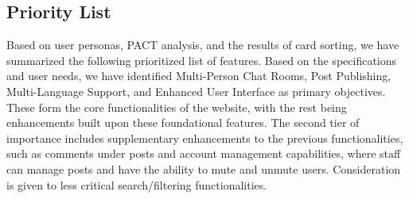 \documentclass[12pt]{article}
\begin{document}
\subsection{Priority List}

    \hspace{2em}Based on user personas, PACT analysis, and the results of card sorting, we have summarized the following prioritized list of features. Based on the specifications and user needs, we have identified Multi-Person Chat Rooms, Post Publishing, Multi-Language Support, and Enhanced User Interface as primary objectives. These form the core functionalities of the website, with the rest being enhancements built upon these foundational features. The second tier of importance includes supplementary enhancements to the previous functionalities, such as comments under posts and account management capabilities, where staff can manage posts and have the ability to mute and unmute users. Consideration is given to less critical search/filtering functionalities.
\end{document}
